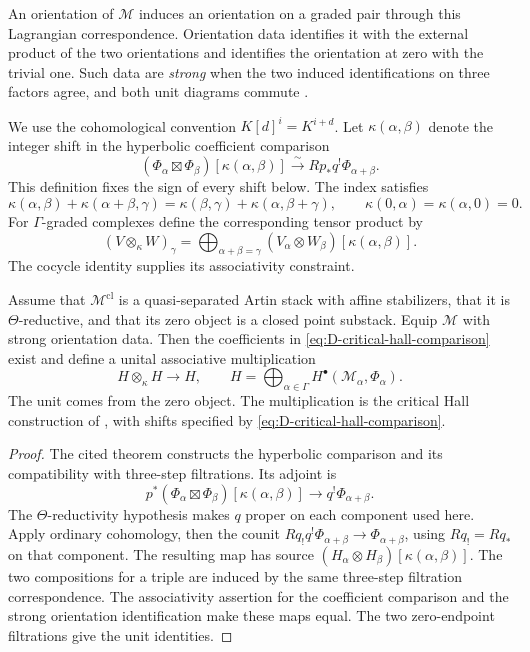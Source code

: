 An orientation of $\mathcal M$ induces an orientation on a graded
pair through this Lagrangian correspondence. Orientation data
identifies it with the external product of the two orientations and
identifies the orientation at zero with the trivial one. Such data
are \emph{strong} when the two induced identifications on three
factors agree, and both unit diagrams commute
\cite[Definition~8.4]{KinjoParkSafronovCoHA}.

We use the cohomological convention $K[d]^i=K^{i+d}$. Let
$\kappa(\alpha,\beta)$ denote the integer shift in the hyperbolic
coefficient comparison
\begin{equation}
\label{eq:D-critical-hall-comparison}
 (\Phi_\alpha\boxtimes\Phi_\beta)[\kappa(\alpha,\beta)]
 \xrightarrow{\ \sim\ } Rp_*q^!\Phi_{\alpha+\beta}.
\end{equation}
This definition fixes the sign of every shift below.
The index satisfies
\[
 \kappa(\alpha,\beta)+\kappa(\alpha+\beta,\gamma)
 =\kappa(\beta,\gamma)+\kappa(\alpha,\beta+\gamma),
 \qquad \kappa(0,\alpha)=\kappa(\alpha,0)=0.
\]
For $\Gamma$-graded complexes define the corresponding tensor product by
\[
 (V\otimes_\kappa W)_\gamma
 =\bigoplus_{\alpha+\beta=\gamma}
       (V_\alpha\otimes W_\beta)[\kappa(\alpha,\beta)].
\]
The cocycle identity supplies its associativity constraint.

\begin{theorem}
\label{thm:hall-product}
Assume that $\mathcal M^{\mathrm{cl}}$ is a quasi-separated Artin
stack with affine stabilizers, that it is $\Theta$-reductive, and
that its zero object is a closed point substack. Equip $\mathcal M$
with strong orientation data. Then the coefficients in
\eqref{eq:D-critical-hall-comparison} exist and define a unital
associative multiplication
\[
 H\otimes_\kappa H\longrightarrow H,
 \qquad
 H=\bigoplus_{\alpha\in\Gamma}
 H^\bullet(\mathcal M_\alpha,\Phi_\alpha).
\]
The unit comes from the zero object. The multiplication is the
critical Hall construction of
\cite[Theorem~8.6, Corollary~8.8 and Proposition~8.29]
{KinjoParkSafronovCoHA}, with shifts specified by
\eqref{eq:D-critical-hall-comparison}.
\end{theorem}

\begin{proof}
The cited theorem constructs the hyperbolic comparison and its
compatibility with three-step filtrations. Its adjoint is
\[
 p^*(\Phi_\alpha\boxtimes\Phi_\beta)
       [\kappa(\alpha,\beta)]
 \longrightarrow q^!\Phi_{\alpha+\beta}.
\]
The $\Theta$-reductivity hypothesis makes $q$ proper on each
component used here. Apply ordinary cohomology, then the counit
$Rq_!q^!\Phi_{\alpha+\beta}\to\Phi_{\alpha+\beta}$, using
$Rq_!=Rq_*$ on that component. The resulting map has source
$(H_\alpha\otimes H_\beta)[\kappa(\alpha,\beta)]$.
The two compositions for a triple are induced by the same
three-step filtration correspondence. The associativity assertion
for the coefficient comparison and the strong orientation
identification make these maps equal. The two zero-endpoint
filtrations give the unit identities.
\end{proof}

